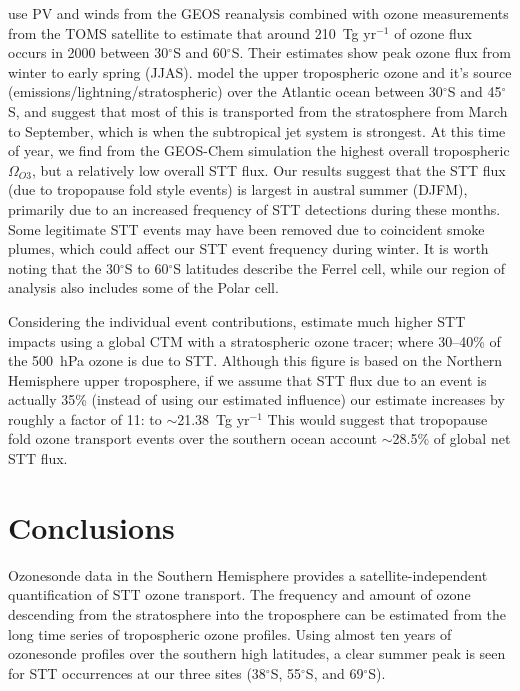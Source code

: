 \documentclass{article}
\begin{document}
  \citet{Olsen2003} use PV and winds from the GEOS reanalysis combined with ozone measurements from the TOMS satellite to estimate that around 210~Tg yr$^{-1}$ of ozone flux occurs in 2000 between 30$^{\circ}$S and 60$^{\circ}$S.
  Their estimates show peak ozone flux from winter to early spring (JJAS).
  \citet{Liu2016} model the upper tropospheric ozone and it's source (emissions/lightning/stratospheric) over the Atlantic ocean between 30$^{\circ}$S and 45$^{\circ}$S, and suggest that most of this is transported from the stratosphere from March to September, which is when the subtropical jet system is strongest.
  At this time of year, we find from the GEOS-Chem simulation the highest overall tropospheric $\Omega_{O3}$, but a relatively low overall STT flux.
  Our results suggest that the STT flux (due to tropopause fold style events) is largest in austral summer (DJFM), primarily due to an increased frequency of STT detections during these months.
  Some legitimate STT events may have been removed due to coincident smoke plumes, which could affect our STT event frequency during winter.
  It is worth noting that the 30$^{\circ}$S to 60$^{\circ}$S latitudes describe the Ferrel cell, while our region of analysis also includes some of the Polar cell.
  
  Considering the individual event contributions, \citet{Terao2008} estimate much higher STT impacts using a global CTM with a stratospheric ozone tracer; where 30--40\% of the 500~hPa ozone is due to STT.
  Although this figure is based on the Northern Hemisphere upper troposphere, if we assume that STT flux due to an event is actually 35\% (instead of using our estimated influence) our estimate increases by roughly a factor of 11: to $\sim$21.38~Tg yr$^{-1}$
  This would suggest that tropopause fold ozone transport events over the southern ocean account $\sim$28.5\% of global net STT flux.
  
\section{Conclusions}
  
  Ozonesonde data in the Southern Hemisphere provides a satellite-independent quantification of STT ozone transport.
  The frequency and amount of ozone descending from the stratosphere into the troposphere can be estimated from the long time series of tropospheric ozone profiles.
  Using almost ten years of ozonesonde profiles over the southern high latitudes, a clear summer peak is seen for STT occurrences at our three sites (38$^{\circ}$S, 55$^{\circ}$S, and 69$^{\circ}$S).
  
\end{document}
